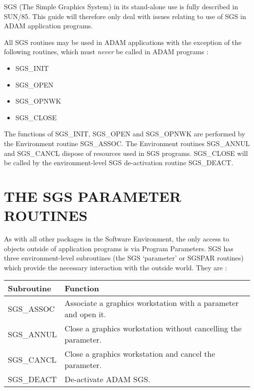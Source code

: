 SGS (The Simple Graphics System) in its stand-alone use is fully described
in SUN/85.
This guide will therefore only deal with issues relating to use of SGS in
ADAM application programs.

All SGS routines may be used in ADAM applications with the exception of the
following routines, which must {\em never} be called in ADAM programs :
\begin{itemize}
\item SGS\_INIT
\item SGS\_OPEN
\item SGS\_OPNWK
\item SGS\_CLOSE
\end{itemize}
The functions of SGS\_INIT, SGS\_OPEN and SGS\_OPNWK are performed by the
Environment routine SGS\_ASSOC.
The Environment routines SGS\_ANNUL and SGS\_CANCL dispose of resources used in
SGS programs.
SGS\_CLOSE will be called by the environment-level SGS de-activation routine
SGS\_DEACT.

\section{THE SGS PARAMETER ROUTINES}
As with all other packages in the Software Environment, the only access to
objects outside of application programs is via Program Parameters.
SGS has three environment-level subroutines (the SGS `parameter' or SGSPAR
routines) which provide the necessary interaction with the outside world.
They are :

\begin{center}
\begin{tabular}{||l|l||} \hline
Subroutine & Function \\ \hline
SGS\_ASSOC  & Associate a graphics workstation with a parameter and open it.\\
SGS\_ANNUL  & Close a graphics workstation without cancelling the parameter.\\
SGS\_CANCL  & Close a graphics workstation and cancel the parameter.\\
SGS\_DEACT  & De-activate ADAM SGS.\\ \hline
\end{tabular}
\end{center}

